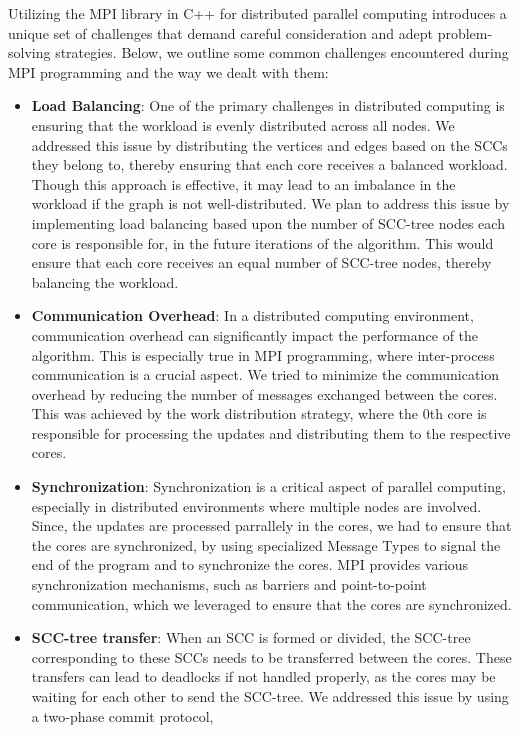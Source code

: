 Utilizing the MPI library in C++ for distributed parallel computing introduces a unique set of challenges that demand careful consideration and adept problem-solving strategies. 
Below, we outline some common challenges encountered during MPI programming and the way we dealt with them:
\begin{itemize}
    \item \textbf{Load Balancing}: One of the primary challenges in distributed computing is ensuring that the workload is evenly distributed across all nodes.
We addressed this issue by distributing the vertices and edges based on the SCCs they belong to, thereby ensuring that each core receives a balanced workload.
Though this approach is effective, it may lead to an imbalance in the workload if the graph is not well-distributed.
We plan to address this issue by implementing load balancing based upon the number of SCC-tree nodes each core is responsible for, in the future iterations of the algorithm.
This would ensure that each core receives an equal number of SCC-tree nodes, thereby balancing the workload.
    \item \textbf{Communication Overhead}: In a distributed computing environment, communication overhead can significantly impact the performance of the algorithm. This is especially true in MPI programming, where inter-process communication is a crucial aspect.
We tried to minimize the communication overhead by reducing the number of messages exchanged between the cores. This was achieved by the work distribution strategy, where the 0th core is responsible for processing the updates and distributing them to the respective cores.
    \item \textbf{Synchronization}: Synchronization is a critical aspect of parallel computing, especially in distributed environments where multiple nodes are involved.
Since, the updates are processed parrallely in the cores, we had to ensure that the cores are synchronized, by using specialized Message Types to signal the end of the program and to synchronize the cores. 
MPI provides various synchronization mechanisms, such as barriers and point-to-point communication, which we leveraged to ensure that the cores are synchronized.
    \item \textbf{SCC-tree transfer}: When an SCC is formed or divided, the SCC-tree corresponding to these SCCs needs to be transferred between the cores.
These transfers can lead to deadlocks if not handled properly, as the cores may be waiting for each other to send the SCC-tree. We addressed this issue by using a two-phase commit protocol, 

\end{itemize}
